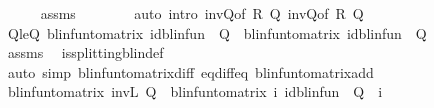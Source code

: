 \begin{isabellebody}
\ \ \ \ \isamarkupfalse%
\ assms\ \ \isanewline
\ \ \ \ \isamarkupfalse%
\ {\isacharparenleft}{\kern0pt}auto\ intro{\isacharcolon}{\kern0pt}\ inv{\isacharunderscore}{\kern0pt}Q{\isacharbrackleft}{\kern0pt}of\ R{}\ Q{}{\isacharbrackright}{\kern0pt}\ inv{\isacharunderscore}{\kern0pt}Q{\isacharbrackleft}{\kern0pt}of\ R{}\ Q{}{\isacharbrackright}{\kern0pt}{\isacharparenright}{\kern0pt}\isanewline
\isanewline
\ \ \isamarkupfalse%
\ Q{}{\isacharunderscore}{\kern0pt}le{\isacharunderscore}{\kern0pt}Q{}{\isacharcolon}{\kern0pt}\ {\isachardoublequoteopen}blinfun{\isacharunderscore}{\kern0pt}to{\isacharunderscore}{\kern0pt}matrix\ {\isacharparenleft}{\kern0pt}id{\isacharunderscore}{\kern0pt}blinfun\ {\isacharminus}{\kern0pt}\ Q{}{\isacharparenright}{\kern0pt}\ {\isasymle}\ blinfun{\isacharunderscore}{\kern0pt}to{\isacharunderscore}{\kern0pt}matrix\ {\isacharparenleft}{\kern0pt}id{\isacharunderscore}{\kern0pt}blinfun\ {\isacharminus}{\kern0pt}\ Q{}{\isacharparenright}{\kern0pt}{\isachardoublequoteclose}\isanewline
\ \ \ \ \isamarkupfalse%
\ assms\ \isamarkupfalse%
\ is{\isacharunderscore}{\kern0pt}splitting{\isacharunderscore}{\kern0pt}blin{\isacharunderscore}{\kern0pt}def{\isacharprime}{\kern0pt}\isanewline
\ \ \ \ \isamarkupfalse%
\ {\isacharparenleft}{\kern0pt}auto\ simp{\isacharcolon}{\kern0pt}\ blinfun{\isacharunderscore}{\kern0pt}to{\isacharunderscore}{\kern0pt}matrix{\isacharunderscore}{\kern0pt}diff\ eq{\isacharunderscore}{\kern0pt}diff{\isacharunderscore}{\kern0pt}eq\ blinfun{\isacharunderscore}{\kern0pt}to{\isacharunderscore}{\kern0pt}matrix{\isacharunderscore}{\kern0pt}add{\isacharparenright}{\kern0pt}\isanewline
\isanewline
\ \ \isamarkupfalse%
\ {\isachardoublequoteopen}blinfun{\isacharunderscore}{\kern0pt}to{\isacharunderscore}{\kern0pt}matrix\ {\isacharparenleft}{\kern0pt}inv\isactrlsub L\ Q{}{\isacharparenright}{\kern0pt}\ {\isacharequal}{\kern0pt}\ blinfun{\isacharunderscore}{\kern0pt}to{\isacharunderscore}{\kern0pt}matrix\ {\isacharparenleft}{\kern0pt}{\isacharparenleft}{\kern0pt}{\isasymSum}i{\isachardot}{\kern0pt}\ {\isacharparenleft}{\kern0pt}id{\isacharunderscore}{\kern0pt}blinfun\ {\isacharminus}{\kern0pt}\ Q{}{\isacharparenright}{\kern0pt}\ {\isacharcircum}{\kern0pt}{\isacharcircum}{\kern0pt}\ i{\isacharparenright}{\kern0pt}{\isacharparenright}{\kern0pt}{\isachardoublequoteclose}\isanewline
\ \ \ \ \isamarkupfalse%

\end{isabellebody}
